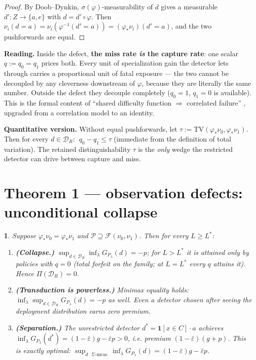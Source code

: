 \documentclass[11pt]{article}
\theoremstyle{plain}
\newtheorem*{namedthminner}{\namedthmname}
\newenvironment{nthm}[1]{\def\namedthmname{#1}\begin{namedthminner}}{\end{namedthminner}}
\theoremstyle{definition}
\begin{document}
\begin{proof}
By Doob--Dynkin, $\sigma(\varphi)$-measurability of $d$ gives a
measurable $d' : Z \to \{a,e\}$ with $d = d' \circ \varphi$. Then
$\nu_i(d = a) = \nu_i(\varphi^{-1}(d'{=}a)) = (\varphi_*\nu_i)(d'{=}a)$, and
the two pushforwards are equal.
\end{proof}

\textbf{Reading.} Inside the defect, \textbf{the miss rate \emph{is} the capture rate}: one
scalar $q := q_0 = q_1$ prices both. Every unit of specialization gain the
detector lets through carries a proportional unit of fatal exposure --- the
two cannot be decoupled by any cleverness downstream of $\varphi$, because
they are literally the same number. Outside the defect they decouple
completely ($q_0 = 1$, $q_1 = 0$ is available). This is the formal content of
``shared difficulty function $\Rightarrow$ correlated failure'' \citep{eckhardt1985,littlewood2012}, upgraded from a correlation model to an identity.

\textbf{Quantitative version.} Without equal pushforwards, let
$\tau := \mathrm{TV}(\varphi_*\nu_0, \varphi_*\nu_1)$. Then for every
$d \in \mathcal{D}_R$: $\;q_0 - q_1 \leq \tau$ (immediate from the definition
of total variation). The retained distinguishability $\tau$ is the \emph{only}
wedge the restricted detector can drive between capture and miss.

\section{Theorem 1 --- observation defects: unconditional collapse}\label{app:thm1}

\begin{nthm}{Theorem 1}
Suppose $\varphi_*\nu_0 = \varphi_*\nu_1$ and
$\mathcal{P} \supseteq \mathcal{F}(\nu_0, \nu_1)$. Then for every
$L \geq L^*$:
\begin{enumerate}
\item \textbf{(Collapse.)} $\displaystyle \sup_{d \in \mathcal{D}_R} \inf_{\lambda} G_{P_\lambda}(d) = -p$; for $L > L^*$ it is attained only by policies with $q = 0$ (total forfeit on the family; at $L = L^*$ every $q$ attains it). Hence $\Pi(\mathcal{D}_R) = 0$.
\item \textbf{(Transduction is powerless.)} Minimax equality holds:
   $\displaystyle \inf_{\lambda} \sup_{d \in \mathcal{D}_R} G_{P_\lambda}(d) = -p$ as well. Even a detector chosen \emph{after} seeing the deployment distribution earns zero premium.
\item \textbf{(Separation.)} The unrestricted detector $d^*= \mathbf{1}[x \in C]\cdot a$ achieves $\inf_\lambda G_{P_\lambda}(d^*) = (1-\bar\varepsilon)g - \bar\varepsilon p > 0$, i.e. premium $(1-\bar\varepsilon)(g+p)$. This is exactly optimal: $\sup_{d \text{ } \Sigma\text{-meas.}} \inf_\lambda G_{P_\lambda}(d) = (1-\bar\varepsilon)g - \bar\varepsilon p$.
\end{enumerate}
\end{nthm}
\end{document}
